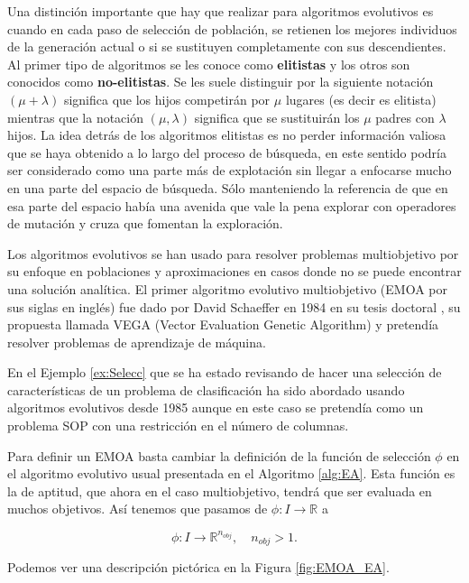 Una distinción importante que hay que realizar para algoritmos evolutivos es cuando en cada paso de selección de población, se retienen los mejores individuos de la generación actual o si se sustituyen completamente con sus descendientes. Al primer tipo de algoritmos se les conoce como \textbf{elitistas} y los otros son conocidos como \textbf{no-elitistas}. Se les suele distinguir por la siguiente notación $(\mu+\lambda)$ significa que los hijos competirán por $\mu$ lugares (es decir es elitista) mientras que la notación $(\mu,\lambda)$ significa que se sustituirán los $\mu$ padres con $\lambda$ hijos. La idea detrás de los algoritmos elitistas es no perder información valiosa que se haya obtenido a lo largo del proceso de búsqueda, en este sentido podría ser considerado como una parte más de explotación sin llegar a enfocarse mucho en una parte del espacio de búsqueda. Sólo manteniendo la referencia de que en esa parte del espacio había una avenida que vale la pena explorar con operadores de mutación y cruza que fomentan la exploración.
    
Los algoritmos evolutivos se han usado para resolver problemas multiobjetivo por su enfoque en poblaciones y aproximaciones en casos donde no se puede encontrar una solución analítica. El primer algoritmo evolutivo multiobjetivo (EMOA por sus siglas en inglés) fue dado por David Schaeffer en 1984 en su tesis doctoral \cite{schafferMultipleObjectiveOptimization1984}, su propuesta llamada VEGA (Vector Evaluation Genetic Algorithm) y pretendía resolver problemas de aprendizaje de máquina.

En el Ejemplo \ref{ex:Selecc} que se ha estado revisando de hacer una selección de características de un problema de clasificación  ha sido abordado usando algoritmos evolutivos desde 1985 \cite{SIEDLECKI1989335} aunque en este caso se pretendía como un problema SOP con una restricción en el número de columnas. 


Para definir un EMOA basta cambiar la definición de la función de selección $\phi$ en el algoritmo evolutivo usual presentada en el Algoritmo \ref{alg:EA}. Esta función es la de aptitud, que ahora en el caso multiobjetivo, tendrá que ser evaluada en muchos objetivos. Así tenemos que pasamos de $\phi:I\rightarrow \mathbb{R}$ a

$$\phi:I\rightarrow \mathbb{R}^{n_{obj}}, \quad n_{obj}>1.$$


Podemos ver una descripción pictórica en la Figura \ref{fig:EMOA_EA}.

